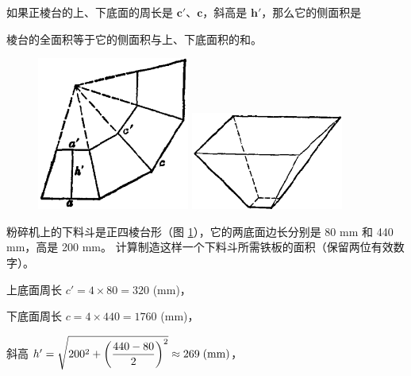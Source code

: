 \begin{enhancedline}
\begin{dingli}
    如果正棱台的上、下底面的周长是 $\bm{c'}$、$\bm{c}$，斜高是 $\bm{h'}$，那么它的侧面积是
    \begin{center}
    \end{center}
\end{dingli}


棱台的全面积等于它的侧面积与上、下底面积的和。


\begin{figure}[htbp]
    \centering
    \begin{minipage}[b]{7cm}
        \centering
        \includegraphics[width=5cm]{../pic/ltjh-ch2-25.png}
        \caption{}\label{fig:ltjh-2-25}
    \end{minipage}
    \qquad
    \begin{minipage}[b]{7cm}
        \centering
        \includegraphics[width=5cm]{../pic/ltjh-ch2-26.png}
        \caption{}\label{fig:ltjh-2-26}
    \end{minipage}
\end{figure}


\liti 粉碎机上的下料斗是正四棱台形（图 \ref{fig:ltjh-2-26}），它的两底面边长分别是 80 mm 和 440 mm，高是 200 mm。
计算制造这样一个下料斗所需铁板的面积（保留两位有效数字）。

\jie 上底面周长 $c' = 4 \times 80 = 320$ (mm)，

\qquad 下底面周长 $c = 4 \times 440 = 1760$ (mm)，

斜高 $h' = \sqrt{200^2 + \left(\dfrac{440 - 80}{2}\right)^2} \approx 269\;(\mathord{\text{mm}})$，


\end{enhancedline}
